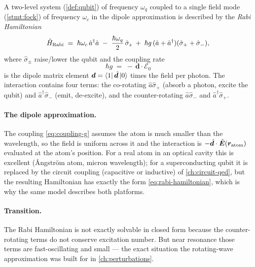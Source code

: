\begin{statement}
\label{stmt:rabi-hamiltonian}
A two-level system (\cref{def:qubit}) of frequency $\omega_q$
coupled to a single field mode (\cref{stmt:fock}) of frequency
$\omega_c$ in the dipole approximation is described by the
\emph{Rabi Hamiltonian}
\begin{equation}
\label{eq:rabi-hamiltonian}
\hat{H}_{\rm Rabi} \;=\; \hbar\omega_c\,\hat a^\dagger\hat a
\;-\; \frac{\hbar\omega_q}{2}\,\hat\sigma_z
\;+\; \hbar g\,(\hat a+\hat a^\dagger)(\hat\sigma_+ + \hat\sigma_-),
\end{equation}
where $\hat\sigma_\pm$ raise/lower the qubit and the coupling rate
\begin{equation}
\label{eq:coupling-g}
\hbar g \;=\; -\,\bm d\cdot\bm{\mathcal E}_0
\end{equation}
is the dipole matrix element $\bm d=\bra{1}\hat{\bm d}\ket{0}$
times the field per photon. The interaction contains four terms:
the co-rotating $\hat a\hat\sigma_+$ (absorb a photon, excite the
qubit) and $\hat a^\dagger\hat\sigma_-$ (emit, de-excite), and the
counter-rotating $\hat a\hat\sigma_-$ and $\hat a^\dagger\hat\sigma_+$.
\end{statement}

\paragraph{The dipole approximation.}
The coupling \cref{eq:coupling-g} assumes the atom is much smaller
than the wavelength, so the field is uniform across it and the
interaction is $-\hat{\bm d}\cdot\hat{\bm E}(\bm r_{\rm atom})$
evaluated at the atom's position. For a real atom in an optical
cavity this is excellent (Ångström atom, micron wavelength); for a
superconducting qubit it is replaced by the circuit coupling
(capacitive or inductive) of \cref{ch:circuit-qed}, but the
resulting Hamiltonian has exactly the form \cref{eq:rabi-hamiltonian},
which is why the same model describes both platforms.

\paragraph{Transition.}
The Rabi Hamiltonian is not exactly solvable in closed form because
the counter-rotating terms do not conserve excitation number. But
near resonance those terms are fast-oscillating and small --- the
exact situation the rotating-wave approximation was built for in
\cref{ch:perturbations}.

